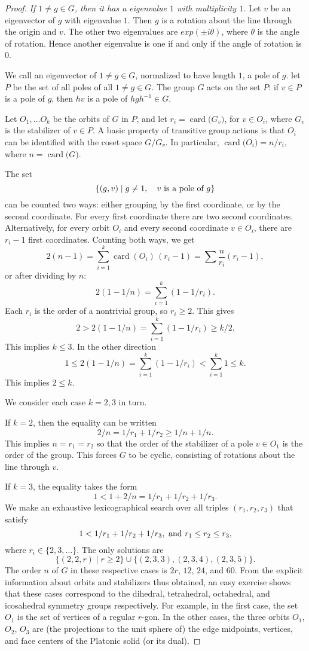 \documentclass{amsart}
\def\op#1{{\operatorname{#1}}}
\def\card#1{\op{card}{#1}}
\def\claim#1{{\it #1}}
\begin{document}
\begin{proof}
\claim{If $1\ne g\in G$, then it has a eigenvalue $1$ with multiplicity $1$.}  Let $v$ be an eigenvector
of $g$ with eigenvalue $1$.  Then $g$ is a rotation about the line through the origin and $v$.  The other
two eigenvalues are $exp(\pm i \theta)$, where $\theta$ is the angle of rotation.  Hence another eigenvalue
is one if and only if the angle of rotation is $0$.

We call an eigenvector of $1\ne g\in G$, normalized to have length $1$, a pole of $g$.  let $P$ be the
set of all poles of all $1\ne g\in G$.  
The group $G$ acts on the set $P$: if $v\in P$ is a pole of $g$, then $h v$ is a pole of $h g h^{-1}\in G$.

Let $O_1,\ldots O_k$ be the orbits of $G$ in $P$, and let $r_i=\card(G_v)$, for $v\in O_i$,
where $G_v$ is the stabilizer of $v\in P$.
A basic property
of transitive group actions is that $O_i$ can be identified with the coset space $G/G_v$.
In particular, $\card(O_i) = n/r_i$, where $n=\card(G)$.

The set
\[
\{(g,v)\mid g\ne 1,\quad v \hbox{ is a pole of } g\}
\]
can be counted two ways: either grouping by the first coordinate, or by the second coordinate.
For every first coordinate there are two second coordinates.  Alternatively,
for every orbit $O_i$ and every second coordinate $v\in O_i$, there
are $r_i - 1$ first coordinates.  Counting both ways, we get
\[
2 (n-1) = \sum_{i=1}^k \card{(O_i)}\, (r_i - 1) =  \sum \frac{n}{r_i}(r_i-1),
\]
or after dividing by $n$:
\[
2 (1 - 1/n) = \sum_{i=1}^k (1-1/r_i).
\]
Each $r_i$ is the order of a nontrivial group, so $r_i\ge2$.
This gives
\[
2 > 2 (1-1/n) =\sum_{i=1}^k (1-1/r_i) \ge k/2.
\]
This implies $k\le 3$.  
In the other direction
\[
1 \le 2(1-1/n) = \sum_{i=1}^k (1-1/r_i) < \sum_{i=1}^k 1 \le k.
\]
This implies $2\le k$.

We consider each case $k=2,3$ in turn.

If $k=2$, then the equality can be written
\[
2/n = 1/r_1 + 1/r_2 \ge 1/n + 1/n.
\]
This implies $n=r_1 = r_2$ so that the order of the stabilizer of a
pole $v\in O_1$ is the order of the group.  This forces $G$ to be
cyclic, consisting of rotations about the line through $v$.

If $k=3$, the equality takes the form
\[
1< 1 + 2/n = 1/r_1 + 1/r_2 + 1/r_3.
\]
We make an exhaustive lexicographical search over all triples
$(r_1,r_2,r_3)$ that satisfy
\[
1 < 1/r_1 + 1/r_2 + 1/r_3, \hbox{ and } r_1 \le r_2 \le r_3,
\]
where $r_i \in \{2,3,\ldots\}$.
The only solutions are 
\[
\{ (2,2,r)\mid r\ge 2\} \cup \{(2,3,3),(2,3,4),(2,3,5)\}.
\]
The order $n$ of $G$ in these respective cases is $2r$, $12$, $24$,
and $60$.  From the explicit information about orbits and stabilizers
thus obtained, an easy exercise shows that these cases correspond to
the dihedral, tetrahedral, octahedral, and icosahedral symmetry groups
respectively.  For example, in the first case, the set $O_1$ is the
set of vertices of a regular $r$-gon. In the other cases, the three
orbits $O_1$, $O_2$, $O_3$ are (the projections to the unit sphere of)
the edge midpoints, vertices, and face centers of the Platonic
solid (or its dual).
\end{proof}
\end{document}
